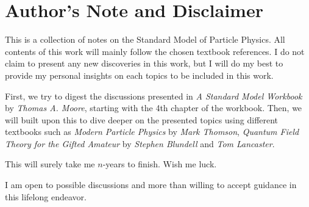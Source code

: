 \chapter{Author's Note and Disclaimer}

This is a collection of notes on the Standard Model of Particle Physics. All contents of this work will mainly follow the chosen textbook references. I do not claim to present any new discoveries in this work, but I will do my best to provide my personal insights on each topics to be included in this work.

First, we try to digest the discussions presented in \emph{A Standard Model Workbook} by \textit{Thomas A. Moore}, starting with the 4th chapter of the workbook. Then, we will built upon this to dive deeper on the presented topics using different textbooks such as \emph{Modern Particle Physics} by \textit{Mark Thomson}, \emph{Quantum Field Theory for the Gifted Amateur} by \textit{Stephen Blundell} and \textit{Tom Lancaster}.

This will surely take me $n$-years to finish. Wish me luck.

I am open to possible discussions and more than willing to accept guidance in this lifelong endeavor.